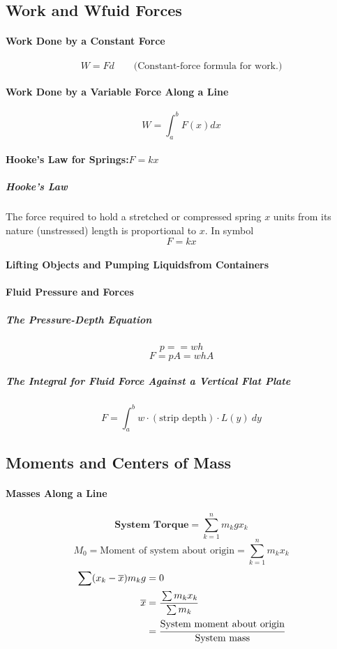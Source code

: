 \documentclass{article}
\begin{document}
        \subsection{Work and Wfuid Forces}
            \paragraph{Work Done by a Constant Force}
            \[W=Fd\qquad\text{(Constant-force formula for work.)}\]
            \paragraph{Work Done by a Variable Force Along a Line}
            \[W=\int_a^bF(x)dx\]
            \paragraph{Hooke's Law for Springs:$F=kx$}
                \subparagraph{Hooke's Law} The force required to hold a stretched or compressed spring $x$ units from its nature (unstressed) length is proportional to $x$. In symbol
                \[F=kx\]
            \paragraph{Lifting Objects and Pumping Liquidsfrom Containers}
            \paragraph{Fluid Pressure and Forces}    
                \subparagraph{The Pressure-Depth Equation}
                \[p==wh\]
                \[F=pA=whA\]
                \subparagraph{The Integral for Fluid Force Against a Vertical Flat Plate}
                \[F=\int_a^b w\cdot(\text{strip depth})\cdot L(y)\ dy\]
        \subsection{Moments and Centers of Mass}
            \paragraph{Masses Along a Line}
            \[\textbf{System Torque}=\sum_{k=1}^n m_k g x_k\]
            \[M_0=\text{Moment of system about origin}=\sum_{k=1}^n m_k x_k\]
            \begin{equation}
                \begin{aligned}
                    \sum (x_k-\overline{x})m_k g&=0\\
                    \overline{x}&=\cfrac{\sum m_k x_k}{\sum m_k}\\
                    &=\cfrac{\text{System moment about origin}}{\text{System mass}}
                \end{aligned}
            \end{equation}
\end{document}
